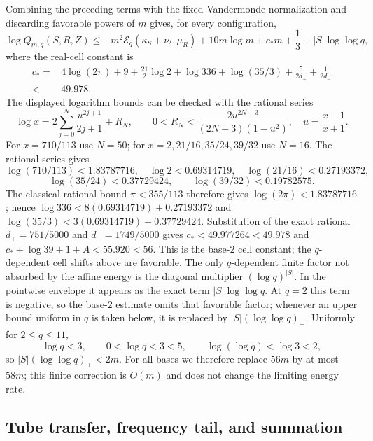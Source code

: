 Combining the preceding terms with the fixed Vandermonde normalization and
discarding favorable powers of $m$ gives, for every configuration,
\[
 \log Q_{m,q}(S,R,Z)
 \le -m^2\mathcal E_q(\kappa_S+\nu_\delta,\mu_R)
   +10m\log m+c_*m+\frac13
   +|S|\log\log q,
\]
where the real-cell constant is
\begin{align*}
c_*={}&4\log(2\pi)+9+\frac{21}{2}\log2+\log336+\log(35/3)
                         +\frac5{2d_+}+\frac1{2d_-}\\
 <{}&49.978.
\end{align*}
The displayed logarithm bounds can be checked with the rational series
\[
 \log x=2\sum_{j=0}^{N}\frac{u^{2j+1}}{2j+1}+R_N,\qquad
 0<R_N<\frac{2u^{2N+3}}{(2N+3)(1-u^2)},\quad
 u=\frac{x-1}{x+1}.
\]
For $x=710/113$ use $N=50$; for
$x=2,21/16,35/24,39/32$ use $N=16$.  The rational series gives
\[
 \log(710/113)<1.83787716,\quad \log2<0.69314719,
 \quad \log(21/16)<0.27193372,
\]
\[
 \log(35/24)<0.37729424,\qquad \log(39/32)<0.19782575.
\]
The classical rational bound $\pi<355/113$ therefore gives
$\log(2\pi)<1.83787716$; hence
$\log336<8(0.69314719)+0.27193372$ and
$\log(35/3)<3(0.69314719)+0.37729424$.
Substitution of the exact rational $d_+=751/5000$ and
$d_-=1749/5000$ gives $c_*<49.977264<49.978$ and
$c_*+\log39+1+A<55.920<56$.
This is the base-$2$ cell constant; the $q$-dependent cell shifts above are
favorable.  The only $q$-dependent finite factor not absorbed by the affine
energy is the diagonal multiplier $(\log q)^{|S|}$.  In the pointwise
envelope it appears as the exact term $|S|\log\log q$.  At $q=2$ this term
is negative, so the base-$2$ estimate omits that favorable factor; whenever an
upper bound uniform in $q$ is taken below, it is replaced by
$|S|(\log\log q)_+$.  Uniformly
for $2\le q\le11$,
\[
 \log q<3,\qquad 0<\log q<3<5,\qquad \log(\log q)<\log3<2,
\]
so $|S|(\log\log q)_+<2m$.  For all bases we therefore replace $56m$ by at
most $58m$; this
finite correction is $O(m)$ and does not change the limiting energy rate.

\subsection{Tube transfer, frequency tail, and summation}

